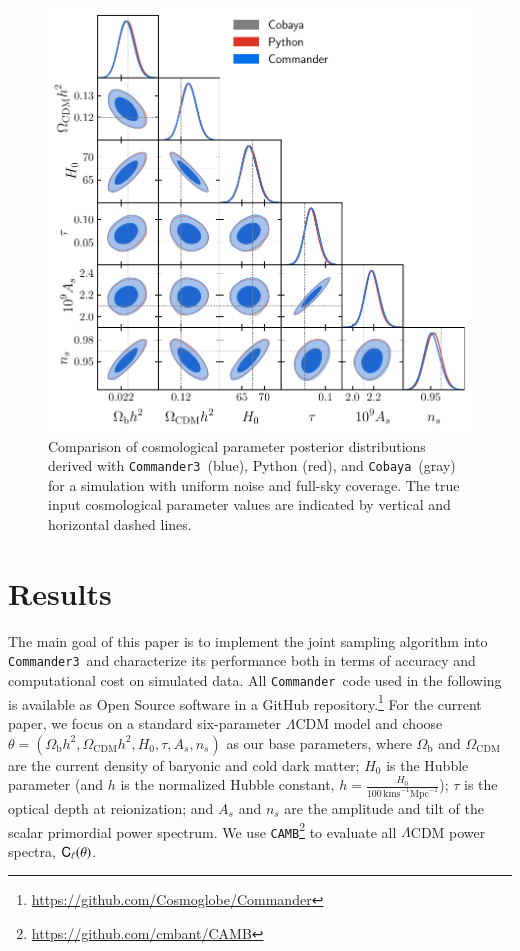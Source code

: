 \documentclass[twocolumn]{../common/aa}
\def\commander{\texttt{Commander}}
\def\commanderthree{\texttt{Commander3}}
\def\cobaya{\texttt{Cobaya}}
\def\camb{\texttt{CAMB}}
\renewcommand{\C}[0]{\tens{C}}
\begin{document}
\begin{figure}
	\centering
	\includegraphics[width=\linewidth]{figures/dist_posterior_no_mask.pdf}
	\caption{\label{fig:nomask}Comparison of cosmological parameter posterior distributions derived with \commanderthree\ (blue), Python (red), and \cobaya\ (gray) for a simulation with uniform noise and full-sky coverage. The true input cosmological parameter values are indicated by vertical and horizontal dashed lines.}
\end{figure}


\section{Results}
\label{sec:results}

The main goal of this paper is to implement the joint sampling algorithm into \commanderthree\ and characterize its performance both in terms of accuracy and computational cost on simulated data. All \commander\ code used in the following is available as Open Source software in a GitHub repository.\footnote{\url{https://github.com/Cosmoglobe/Commander}} For the current paper, we focus on a standard six-parameter $\Lambda$CDM model and choose $\theta=(\Omega_{\textrm{b}}h^2, \Omega_{\textrm{CDM}}h^2, H_0, \tau, A_s, n_s)$ as our base parameters, where $\Omega_\mathrm{b}$ and $\Omega_\mathrm{CDM}$ are the current density of baryonic and cold dark matter; $H_0$ is the Hubble parameter (and $h$ is the normalized Hubble constant, $h=\frac{H_0}{100\,\mathrm{km s}^{-1} \mathrm{Mpc}^{-1}}$); $\tau$ is the optical depth at reionization; and $A_s$ and $n_s$ are the amplitude and tilt of the scalar primordial power spectrum. We use \camb\footnote{\url{https://github.com/cmbant/CAMB}}\citep{Lewis:1999bs} to evaluate all $\Lambda$CDM power spectra, $\C_{\ell}(\theta)$.
\end{document}
